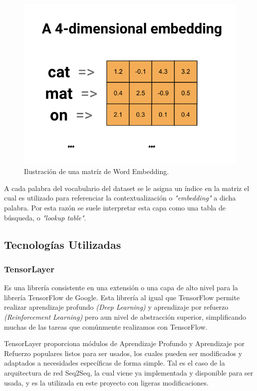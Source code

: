 \documentclass[12pt, letterpaper]{article}
\begin{document}
    \begin{figure}[H]
        \centering
        \includegraphics[width=0.8\linewidth]{img/4dim_embedding2.png}
        \caption{Ilustración de una matríz de Word Embedding.}
    \end{figure}
    A cada palabra del vocabulario del dataset se le asigna un índice en la matriz el cual es utilizado para referenciar la contextualización o \emph{"embedding"} a dicha palabra. Por esta razón se suele interpretar esta capa como una tabla de búsqueda, o \emph{"lookup table"}\cite{tf_wb}.

    \subsection{Tecnologías Utilizadas}
        \subsubsection{TensorLayer}
        Es una librería consistente en una extensión o una capa de alto nivel para la librería TensorFlow de Google. Esta librería al igual que TensorFlow permite realizar aprendizaje profundo \emph{(Deep Learning)} y aprendizaje por refuerzo \emph{(Reinforcement Learning)} pero aun nivel de abstracción superior, simplificando muchas de las tareas que comúnmente realizamos con TensorFlow.
        
        TensorLayer proporciona módulos de Aprendizaje Profundo y Aprendizaje por Refuerzo populares listos para ser usados, los cuales pueden ser modificados y adaptados a necesidades específicas de forma simple. Tal es el caso de la arquitectura de red Seq2Seq, la cual viene ya implementada y disponible para ser usada, y es la utilizada en este proyecto con ligeras modificaciones.
        
\end{document}
